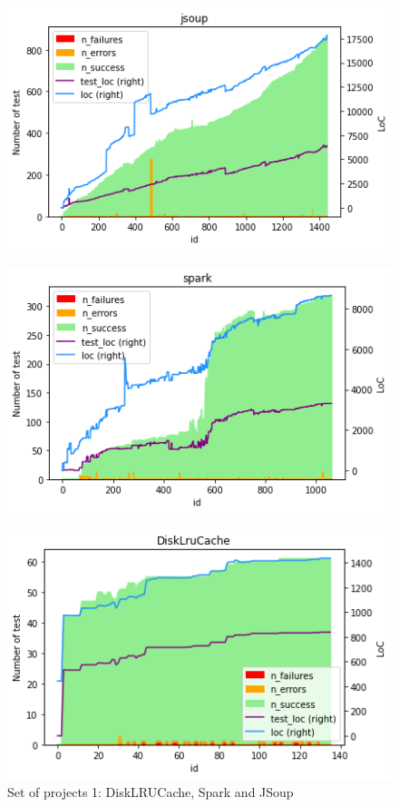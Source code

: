 \begin{figure}[!htb]
    \centering
    \caption{Set of projects 1: DiskLRUCache, Spark and JSoup}
    \label{fig:projects-1}
    \begin{minipage}{.5\textwidth}
        \centering
        \includegraphics[width=\textwidth]{pages/02-Testability/images/projects/jsoup.png}
        \label{fig:jsoup}
    \end{minipage}%
    \begin{minipage}{.5\textwidth}
        \centering
        \includegraphics[width=\textwidth]{pages/02-Testability/images/projects/spark.png}
        \label{fig:spark}
    \end{minipage}
    \begin{minipage}{.5\textwidth}
        \centering
        \includegraphics[width=\textwidth]{pages/02-Testability/images/projects/disklrucache.png}

\end{minipage}
\end{figure}
